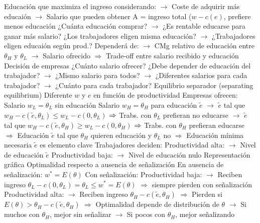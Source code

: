 \documentclass{nuevotema}
\begin{document}
\begin{esquemal}
				\4[] Educación que maximiza el ingreso considerando:
				\4[] $\to$ Coste de adquirir más educaión
				\4[] $\to$ Salario que pueden obtener
				\4[] A = ingreso total ($w-c(e)$, prefiere menos educación
				\4[] ¿Cuánta educación comprar?
				\4[] $\to$ ¿Es rentable educarse para ganar más salario?
				\4[] ¿Los trabajadores eligen misma educación?
				\4[] $\to$ ¿Trabajadores eligen educaión según prod.?
				\4[] Dependerá de:
				\4[] $\to$ CMg relativo de educación entre $\theta_H$ y $\theta_L$
				\4[] $\to$ Salario ofrecido
				\4[] $\Rightarrow$ Trade-off entre salario recibido y educación
				\4 Decisión de empresas
				\4[] ¿Cuánto salario ofrecer?
				\4[] ¿Debe depender de educación del trabajador?
				\4[] $\to$ ¿Mismo salario para todos?
				\4[] $\to$ ¿Diferentes salarios para cada trabajador?
				\4[] $\to$ ¿Cuánto para cada trabajador?
			\3 Equilibrio separador (separating equilibrium)
				\4 Diferente $w$ y $e$ en función de productividad
				\4 Empresas ofrecen:
				\4[] Salario $w_L = \theta_L$ sin educación
				\4[] Salario $w_H = \theta_H$ para educación $\tilde{e}$
				\4[] $\to$ $\tilde{e}$ tal que $w_H - c(\tilde{e}, \theta_L) \leq w_L - c(0, \theta_L)$
				\4[] $\Rightarrow$ Trabs. con $\theta_L$ prefieran no educarse
				\4[] $\to$ $\tilde{e}$ tal que $w_H - c(\tilde{e}, \theta_H) \geq w_L - c(0, \theta_H)$
				\4[] $\Rightarrow$ Trabs. con $\theta_H$ prefieran educarse
				\4[] $\Rightarrow$ Educación $\tilde{e}$ tal que $\theta_H$ quieren educación y $\theta_L$ no
				\4[] $\Rightarrow$ Educación mínima necesaria $\tilde{e}$ es elemento clave
				\4 Trabajadores deciden:
				\4[] Productividad alta:
				\4[] $\to$ Nivel de educación $\tilde{e}$
				\4[] Productividad baja:
				\4[] $\to$ Nivel de educación nulo
				\4 Representación gráfica
				\4[] 
				\4 Optimalidad respecto a ausencia de señalización
				\4[] En ausencia de señalización:%
				\4[] $w^* = E(\theta)$
				\4[] Con señalización:
				\4[] Productividad baja:
				\4[] $\to$ Reciben ingreso $\theta_L - c(0, \theta_L) = \theta_L \leq w^* = E(\theta)$
				\4[] $\Rightarrow$ siempre pierden con señalización
				\4[] Productividad alta:
				\4[] $\to$ Reciben ingreso $\theta_H - c(\tilde{e}, \theta_H)$
				\4[] $\Rightarrow$ Pierden si $E(\theta) > \theta_H - c(\tilde{e}, \theta_H)$
				\4[] $\Rightarrow$ Optimalidad depende de distribución de $\theta$
				\4[] $\to$ Si muchos con $\theta_H$, mejor sin señalizar
				\4[] $\to$ Si pocos con $\theta_H$, mejor señalizando

\end{esquemal}
\end{document}
